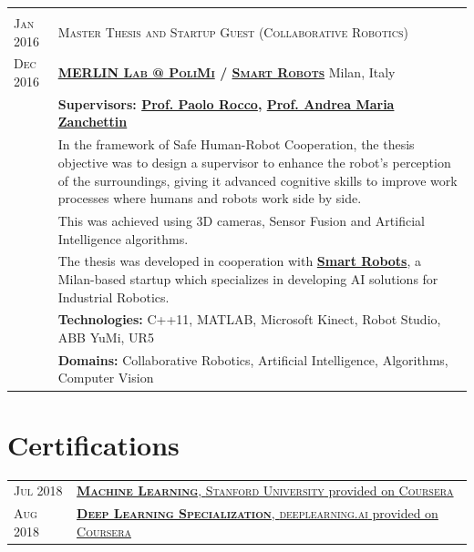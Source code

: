 \documentclass[a4paper,10pt]{article}
\begin{document}
\begin{tabular}{p{1.7cm}|p{15.5cm}}
		\multicolumn{2}{c}{} \\
		\centering\textsc{Jan 2016 } & 
		\textsc{Master Thesis and Startup Guest (Collaborative Robotics)} \\
		\centering\textsc{Dec 2016} &
		\textsc{\textbf{\href{http://merlin.dei.polimi.it/}{MERLIN Lab @ PoliMi} / \href{http://smartrobots.it/en/}{Smart Robots}}} \hfill Milan, Italy\\
		& \textbf{Supervisors: \href{http://home.deib.polimi.it/rocco/}{Prof. Paolo Rocco}, \href{https://home.deib.polimi.it/zanchettin/index.html}{Prof. Andrea Maria Zanchettin}}\\
		& In the framework of Safe Human-Robot Cooperation, the thesis objective was to design a supervisor to enhance the robot's perception of the surroundings, giving it advanced cognitive skills to improve work processes where humans and robots work side by side.\\
		& This was achieved using 3D cameras, Sensor Fusion and Artificial Intelligence algorithms.\\
		& The thesis was developed in cooperation with \textbf{\href{http://smartrobots.it/en/}{Smart Robots}}, a Milan-based startup which specializes in developing AI solutions for Industrial Robotics.\\
		& \textbf{Technologies:}  C++11, MATLAB, Microsoft Kinect, Robot Studio, ABB YuMi, UR5\\
		& \textbf{Domains:} Collaborative Robotics, Artificial Intelligence, Algorithms, Computer Vision\\
	\end{tabular}

	\section{Certifications}
	\begin{tabular}{p{1.7cm}|p{15.5cm}}
		\centering\textsc{Jul 2018} &
		\href{https://www.coursera.org/account/accomplishments/certificate/PHU5XX9EQ5LP}{\textbf{\textsc{Machine Learning}}, \textsc{Stanford University} provided on \textsc{Coursera}} \\
		\centering\textsc{Aug 2018} &
		\href{https://www.coursera.org/account/accomplishments/specialization/certificate/MQRAWL6XD2QW}{\textbf{\textsc{Deep Learning Specialization}}, \textsc{deeplearning.ai} provided on \textsc{Coursera}} \\
	\end{tabular}
\end{document}
